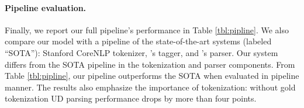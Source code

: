\documentclass[11pt,a4paper]{article}
\newcommand{\yjcomment}[1]{\textcolor{orange}{[$_\mathrm{L}^\mathrm{Y}$#1]}}
\newcommand{\nascomment}[1]{\textcolor{blue}{[#1 ---\textsc{nas}]}}
\newcommand{\yicomment}[1]{\textcolor{gray}{[#1 ---\textsc{Yi}]}}
\begin{document}
\paragraph{Pipeline evaluation.} Finally, we report  our full
pipeline's performance in  Table \ref{tbl:pipline}. We also compare
our model with a pipeline of the state-of-the-art systems (labeled  ``SOTA''):
Stanford CoreNLP tokenizer, %
\citet{owoputi-EtAl:2013:NAACL-HLT}'s tagger, and \citet{DBLP:journals/corr/DozatM16}'s parser.
Our system differs from the SOTA pipeline in the tokenization and parser components.
From Table \ref{tbl:pipline}, our pipeline outperforms the SOTA when
evaluated in pipeline manner.
The results also emphasize the
importance of tokenization:  without gold tokenization
UD parsing
performance drops by more than four points.
\end{document}

